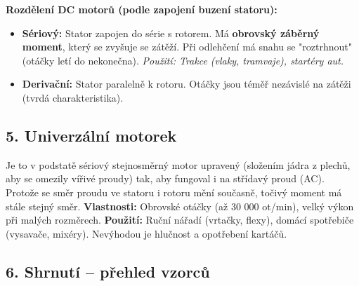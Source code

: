 \documentclass[a4paper,10pt]{article}
\begin{document}
\begin{vysvetlenibox}
\begin{center}
\end{center}

\textbf{Rozdělení DC motorů (podle zapojení buzení statoru):}
\begin{itemize}
  \item \textbf{Sériový:} Stator zapojen do série s rotorem. Má \textbf{obrovský záběrný moment}, který se zvyšuje se zátěží. Při odlehčení má snahu se "roztrhnout" (otáčky letí do nekonečna). \textit{Použití: Trakce (vlaky, tramvaje), startéry aut.}
  \item \textbf{Derivační:} Stator paralelně k rotoru. Otáčky jsou téměř nezávislé na zátěži (tvrdá charakteristika).
\end{itemize}

\subsection*{5. Univerzální motorek}

Je to v podstatě sériový stejnosměrný motor upravený (složením jádra z plechů, aby se omezily vířivé proudy) tak, aby fungoval i na střídavý proud (AC). 
Protože se směr proudu ve statoru i rotoru mění současně, točivý moment má stále stejný směr.
\textbf{Vlastnosti:} Obrovské otáčky (až 30 000 ot/min), velký výkon při malých rozměrech.
\textbf{Použití:} Ruční nářadí (vrtačky, flexy), domácí spotřebiče (vysavače, mixéry). Nevýhodou je hlučnost a opotřebení kartáčů.

\subsection*{6. Shrnutí – přehled vzorců}


\end{vysvetlenibox}
\end{document}
